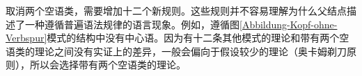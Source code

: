 \zl
取消两个空语类，需要增加十二个新规则。这些规则并不容易理解为什么父结点描述了一种遵循普遍语法规律的语言现象。例如，遵循图\ref{Abbildung-Kopf-ohne-Verbspur}模式的结构中没有中心语。因为有十二条其他模式的理论和带有两个空语类的理论之间没有实证上的差异，一般会偏向于假设较少的理论（奥卡姆剃刀原则），所以会选择带有两个空语类的理论。

